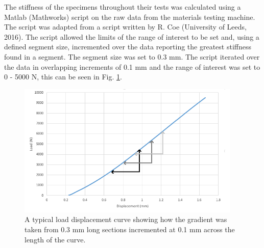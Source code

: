 

The stiffness of the specimens throughout their tests was calculated using a
Matlab (Mathworks) script on the raw data from the materials testing machine. The script was adapted from a script written by R. Coe (University of Leeds, 2016). The script
allowed the limits of the range of interest to be set and, using a defined
segment size, incremented over the data reporting the greatest stiffness found
in a segment. The segment size was set to 0.3 mm. The script iterated over the
data in overlapping increments of 0.1 mm and the range of interest was set to 0 - 5000 N, this can be seen in Fig. \ref{fig:load_disp_incr}.

\begin{figure}[ht!]

\centering
\includegraphics[width=4.18472in]{images/load_disp_incr.png}
\caption{A typical load displacement curve showing how the gradient was taken from 0.3 mm long sections incremented at 0.1 mm across the length of the curve.}
\label{fig:load_disp_incr}
\end{figure}

